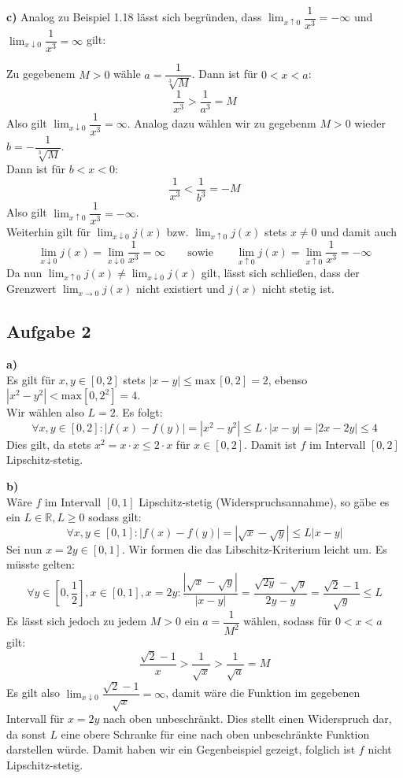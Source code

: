 \documentclass[a4paper,graphics,11pt]{article}
\newcommand{\aufgabe}[1]{\subsection*{Aufgabe #1}}
\begin{document}
\textbf{c)}
Analog zu Beispiel 1.18 lässt sich begründen, dass
$\lim_{x \uparrow 0}\limits\dfrac{1}{x^3} = -\infty$ und
$\lim_{x \downarrow 0}\limits\dfrac{1}{x^3} = \infty$ gilt:

Zu gegebenem $M > 0$ wähle $a= \dfrac{1}{\sqrt[3]{M}}$. Dann ist für $0 < x < a$:
$$
    \frac{1}{x^3} > \frac{1}{a^3} = M
$$
Also gilt $\lim_{x \downarrow 0}\limits \dfrac{1}{x^3} = \infty$. Analog dazu
wählen wir zu gegebenm $M>0$ wieder $b= -\dfrac{1}{\sqrt[3]{M}}$.\\
Dann ist für $b < x < 0$:
$$
    \frac{1}{x^3} < \frac{1}{b^3} = -M
$$
Also gilt $\lim_{x \uparrow 0}\limits \dfrac{1}{x^3} = -\infty$.\\
Weiterhin gilt für $\lim_{x \downarrow 0}\limits j(x)$ bzw. $\lim_{x \uparrow 0}\limits j(x)$ stets $x\neq0$ und damit auch
$$
    \lim_{x \downarrow 0} j(x) = \lim_{x \downarrow 0} \frac{1}{x^3} = \infty
    \qquad\text{sowie}\qquad
    \lim_{x \uparrow 0} j(x) = \lim_{x \uparrow 0} \frac{1}{x^3} = -\infty
$$
Da nun $\lim_{x \uparrow 0}\limits j(x) \neq \lim_{x \downarrow 0}\limits j(x)$ gilt,
lässt sich schließen, dass der Grenzwert $\lim_{x \to 0}\limits j(x)$ nicht existiert und
$j(x)$ nicht stetig ist.

\aufgabe{2}

\textbf{a)}\\
Es gilt für $x,y \in [0,2]$ stets $|x-y| \leq \text{max}\,[0,2] = 2$,
ebenso $|x^2-y^2| < \text{max} [0,2^2] = 4$.\\
Wir wählen also $L = 2$. Es folgt:
$$
    \forall x,y \in [0,2] \colon |f(x)-f(y)| = |x^2-y^2| \leq L \cdot |x-y| = |2x-2y| \leq 4
$$
Dies gilt, da stets $x^2 = x\cdot x \leq 2\cdot x$ für $x \in [0,2]$.
Damit ist $f$ im Intervall $[0,2]$ Lipschitz-stetig.


\textbf{b)}\\
Wäre $f$ im Intervall $[0,1]$ Lipschitz-stetig (Widerspruchsannahme), so gäbe es
ein $L \in \mathbb{R}, L \geq 0$ sodass gilt:
$$
    \forall x,y \in [0,1] \colon |f(x)-f(y)| = |\sqrt{x} -\sqrt{y} | \leq L |x-y|
$$
Sei nun $x = 2y \in [0,1]$. Wir formen die das Libschitz-Kriterium leicht um. Es müsste
gelten:
$$
    \forall y \in \left[0,\frac{1}{2}\right], x \in [0,1], x = 2y\colon
    \frac{|\sqrt{x} - \sqrt{y}|}{|x-y|}
    = \frac{\sqrt{2y} - \sqrt{y}}{2y-y}
    = \frac{\sqrt{2} - 1}{\sqrt{y}} \leq L
$$
Es lässt sich jedoch zu jedem $M > 0$ ein $a = \dfrac{1}{M^2}$ wählen, sodass für $0 < x < a$ gilt:
$$
    \frac{\sqrt{2}-1}{x} > \frac{1}{\sqrt{x}} > \frac{1}{\sqrt{a}} = M
$$
Es gilt also $\lim_{x \downarrow 0}\limits \dfrac{\sqrt{2} - 1}{\sqrt{x}} = \infty$,
damit wäre die Funktion im gegebenen Intervall für $x = 2y$ nach oben unbeschränkt.
Dies stellt einen Widerspruch dar, da sonst $L$ eine obere Schranke
für eine nach oben unbeschränkte Funktion darstellen würde. Damit haben wir ein
Gegenbeispiel gezeigt, folglich ist $f$ nicht Lipschitz-stetig.
\newpage
\end{document}
